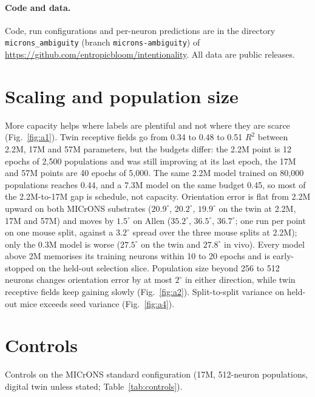\documentclass[11pt]{article}
\newcommand{\Rsq}{R^{2}}
\begin{document}
\paragraph{Code and data.} Code, run configurations and per-neuron predictions are in the directory \texttt{microns\_ambiguity} (branch \texttt{microns-ambiguity}) of \url{https://github.com/entropicbloom/intentionality}. All data are public releases.




\clearpage
\appendix
\renewcommand{\thefigure}{A\arabic{figure}}
\setcounter{figure}{0}
\section{Scaling and population size}\label{app:scaling}
More capacity helps where labels are plentiful and not where they are scarce (Fig.~\ref{fig:a1}). Twin receptive fields go from 0.34 to 0.48 to 0.51 $\Rsq$ between 2.2M, 17M and 57M parameters, but the budgets differ: the 2.2M point is 12 epochs of 2,500 populations and was still improving at its last epoch, the 17M and 57M points are 40 epochs of 5,000. The same 2.2M model trained on 80,000 populations reaches 0.44, and a 7.3M model on the same budget 0.45, so most of the 2.2M-to-17M gap is schedule, not capacity. Orientation error is flat from 2.2M upward on both MICrONS substrates ($20.9^\circ$, $20.2^\circ$, $19.9^\circ$ on the twin at 2.2M, 17M and 57M) and moves by $1.5^\circ$ on Allen ($35.2^\circ$, $36.5^\circ$, $36.7^\circ$; one run per point on one mouse split, against a $3.2^\circ$ spread over the three mouse splits at 2.2M); only the 0.3M model is worse ($27.5^\circ$ on the twin and $27.8^\circ$ in vivo). Every model above 2M memorises its training neurons within 10 to 20 epochs and is early-stopped on the held-out selection slice. Population size beyond 256 to 512 neurons changes orientation error by at most $2^\circ$ in either direction, while twin receptive fields keep gaining slowly (Fig.~\ref{fig:a2}). Split-to-split variance on held-out mice exceeds seed variance (Fig.~\ref{fig:a4}).

\section{Controls}
\label{app:controls}
Controls on the MICrONS standard configuration (17M, 512-neuron populations, digital twin unless stated; Table~\ref{tab:controls}).
\end{document}
